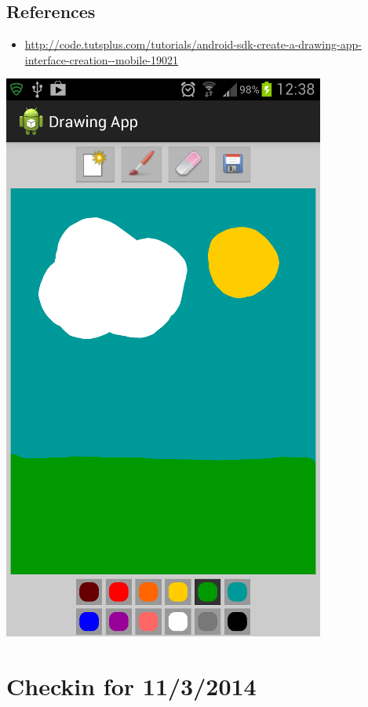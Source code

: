 \documentclass[9pt,b5paper]{article}
\begin{document}
\subsection{References}
\label{sec-1-4}
\begin{itemize}
\item \url{http://code.tutsplus.com/tutorials/android-sdk-create-a-drawing-app-interface-creation--mobile-19021}
\end{itemize}
\includegraphics[width=.9\linewidth]{./android_drawing_final.png}

\section{Checkin for 11/3/2014}
\label{sec-2}
\end{document}
